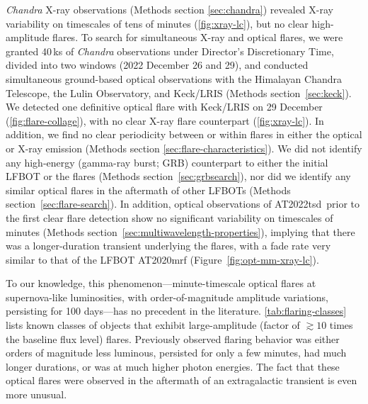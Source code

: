 \documentclass{nature_plusfigure}
\newcommand{\at}{AT2022tsd}
\begin{document}
\emph{Chandra} X-ray observations\cite{Matthews2022} (Methods section \ref{sec:chandra}) revealed X-ray variability on timescales of tens of minutes (\ref{fig:xray-lc}), but no clear high-amplitude flares. To search for simultaneous X-ray and optical flares,
we were granted 40\,ks of {\it Chandra} observations under Director's Discretionary Time, divided into two windows (2022 December 26 and 29),
and conducted simultaneous ground-based optical observations with the Himalayan Chandra Telescope, the Lulin Observatory, and Keck/LRIS (Methods section~\ref{sec:keck}). We detected one definitive optical flare with Keck/LRIS on 29 December (\ref{fig:flare-collage}), with no clear X-ray flare counterpart (\ref{fig:xray-lc}).
In addition, we find no clear periodicity between or within flares in either the optical or X-ray emission (Methods section \ref{sec:flare-characteristics}).
We did not identify any high-energy (gamma-ray burst; GRB) counterpart to either the initial LFBOT or the flares (Methods section~\ref{sec:grbsearch}), nor did we identify any similar optical flares in the aftermath of other LFBOTs (Methods section~\ref{sec:flare-search}).
In addition, optical observations of \at\ prior to the first clear flare detection show no significant variability on timescales of minutes (Methods section~\ref{sec:multiwavelength-properties}), implying that there was a longer-duration transient underlying the flares, with a fade rate very similar to that of the LFBOT AT2020mrf\cite{Yao2022} (Figure~\ref{fig:opt-mm-xray-lc}).

To our knowledge, this phenomenon---minute-timescale optical flares at supernova-like luminosities, with order-of-magnitude amplitude variations, persisting for 100 days---has no precedent in the literature.
\ref{tab:flaring-classes} lists known classes of objects that exhibit large-amplitude (factor of $\gtrsim10$ times the baseline flux level) flares. Previously observed flaring behavior was either orders of magnitude less luminous, persisted for only a few minutes, had much longer durations, or was at much higher photon energies.
The fact that these optical flares were observed in the aftermath of an extragalactic transient is even more unusual.
\end{document}
